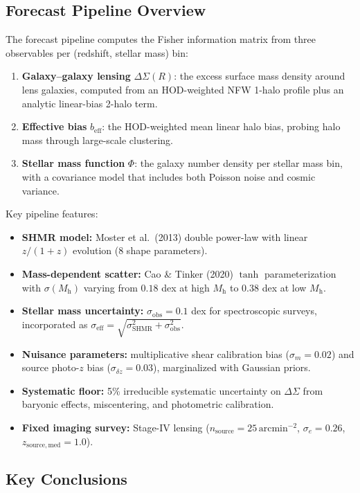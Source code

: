\documentclass[12pt, letterpaper]{article}
\newcommand{\Mh}{M_\mathrm{h}}
\newcommand{\DS}{\Delta\Sigma}
\newcommand{\beff}{b_\mathrm{eff}}
\newcommand{\seff}{\sigma_\mathrm{eff}}
\newcommand{\sobs}{\sigma_\mathrm{obs}}
\newcommand{\sSHMR}{\sigma_\mathrm{SHMR}}
\begin{document}
\subsection{Forecast Pipeline Overview}

The forecast pipeline computes the Fisher information matrix from
three observables per (redshift, stellar mass) bin:
\begin{enumerate}
    \item \textbf{Galaxy--galaxy lensing} $\DS(R)$: the excess surface
    mass density around lens galaxies, computed from an HOD-weighted
    NFW 1-halo profile plus an analytic linear-bias 2-halo term.
    \item \textbf{Effective bias} $\beff$: the HOD-weighted mean
    linear halo bias, probing halo mass through large-scale clustering.
    \item \textbf{Stellar mass function} $\Phi$: the galaxy number
    density per stellar mass bin, with a covariance model that includes
    both Poisson noise and cosmic variance.
\end{enumerate}

Key pipeline features:
\begin{itemize}
    \item \textbf{SHMR model:} Moster et al.\ (2013) double
    power-law with linear $z/(1+z)$ evolution (8 shape parameters).
    \item \textbf{Mass-dependent scatter:} Cao \& Tinker (2020)
    $\tanh$ parameterization with $\sigma(\Mh)$ varying from $0.18$
    dex at high $\Mh$ to $0.38$ dex at low $\Mh$.
    \item \textbf{Stellar mass uncertainty:}
    $\sobs = 0.1$ dex for spectroscopic surveys, incorporated as
    $\seff = \sqrt{\sSHMR^2 + \sobs^2}$.
    \item \textbf{Nuisance parameters:} multiplicative shear
    calibration bias ($\sigma_m = 0.02$) and source photo-$z$ bias
    ($\sigma_{\delta z} = 0.03$), marginalized with Gaussian priors.
    \item \textbf{Systematic floor:} 5\% irreducible systematic
    uncertainty on $\DS$ from baryonic effects, miscentering, and
    photometric calibration.
    \item \textbf{Fixed imaging survey:} Stage-IV lensing
    ($n_\mathrm{source} = 25\,\mathrm{arcmin}^{-2}$,
    $\sigma_e = 0.26$, $z_\mathrm{source,med} = 1.0$).
\end{itemize}

\subsection{Key Conclusions}
\end{document}
